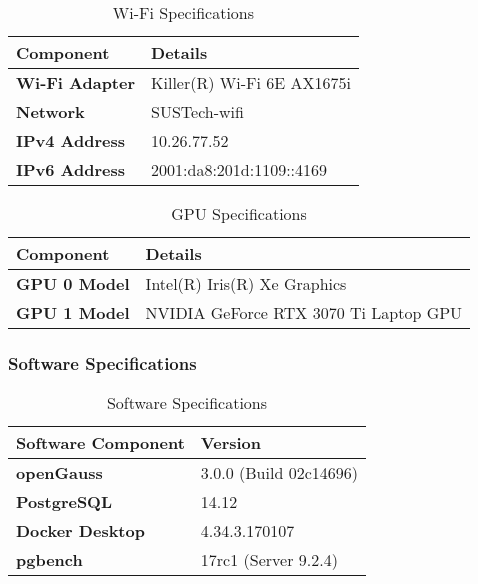 \documentclass[12pt,a4paper,cs4size]{ctexart}
\begin{document}
\begin{table}[h!]
\centering
\captionsetup{labelformat=empty}
\begin{tabular}{|l|l|}
\hline
\textbf{Component} & \textbf{Details} \\ \hline
\textbf{Wi-Fi Adapter} & Killer(R) Wi-Fi 6E AX1675i \\ \hline
\textbf{Network} & SUSTech-wifi \\ \hline
\textbf{IPv4 Address} & 10.26.77.52 \\ \hline
\textbf{IPv6 Address} & 2001:da8:201d:1109::4169 \\ \hline
\end{tabular}
\caption{Wi-Fi Specifications}
\end{table}

\begin{table}[h!]
\centering
\captionsetup{labelformat=empty}
\begin{tabular}{|l|l|}
\hline
\textbf{Component} & \textbf{Details} \\ \hline
\textbf{GPU 0 Model} & Intel(R) Iris(R) Xe Graphics \\ \hline
\textbf{GPU 1 Model} & NVIDIA GeForce RTX 3070 Ti Laptop GPU \\ \hline
\end{tabular}
\caption{GPU Specifications}
\end{table}

\newpage

\subsubsection*{Software Specifications}

\begin{table}[h!]
\centering
\captionsetup{labelformat=empty}
\begin{tabular}{|l|l|}
\hline
\textbf{Software Component} & \textbf{Version} \\ \hline
\textbf{openGauss} & 3.0.0 (Build 02c14696) \\ \hline
\textbf{PostgreSQL} & 14.12 \\ \hline
\textbf{Docker Desktop} & 4.34.3.170107 \\ \hline
\textbf{pgbench}\cite{pgbench2024} & 17rc1 (Server 9.2.4) \\ \hline
\end{tabular}
\caption{Software Specifications}
\end{table}
\end{document}
